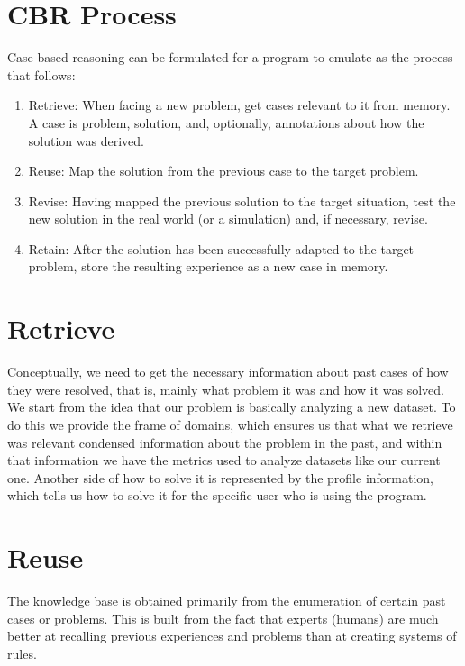 \section{CBR Process}
\label{cap5:sec:process}

Case-based reasoning can be formulated for a program to emulate as the process that follows:

\begin{enumerate}
\item Retrieve: When facing a new problem, get cases relevant to it from memory. A case is problem, solution, and, optionally, annotations about how the solution was derived. 
\item Reuse: Map the solution from the previous case to the target problem. 
\item Revise: Having mapped the previous solution to the target situation, test the new solution in the real world (or a simulation) and, if necessary, revise. 
\item Retain: After the solution has been successfully adapted to the target problem, store the resulting experience as a new case in memory. 
\end{enumerate}

\section{Retrieve}
\label{cap5:sec:retrieve}

Conceptually, we need to get the necessary information about past cases of how they were resolved, that is, mainly what problem it was and how it was solved.
We start from the idea that our problem is basically analyzing a new dataset.
To do this we provide the frame of domains, which ensures us that what we retrieve was relevant condensed information about the problem in the past, and within that information we have the metrics used to analyze datasets like our current one.
Another side of how to solve it is represented by the profile information, which tells us how to solve it for the specific user who is using the program.

\section{Reuse}
\label{cap5:sec:reuse}
The knowledge base is obtained primarily from the enumeration of certain past cases or problems. This is built from the fact that experts (humans) are much better at recalling previous experiences and problems than at creating systems of rules. 

